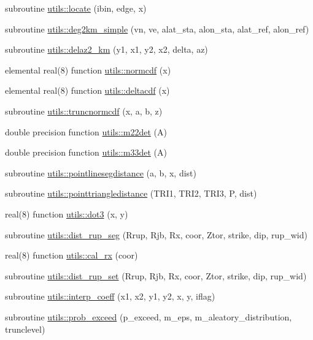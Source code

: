\begin{DoxyCompactItemize}
\item 
subroutine \hyperlink{namespaceutils_a6c61290deedf912e6810628145911f85}{utils\+::locate} (ibin, edge, x)
\item 
subroutine \hyperlink{namespaceutils_aa0f32919ddbbde1b5238425529660459}{utils\+::deg2km\+\_\+simple} (vn, ve, alat\+\_\+sta, alon\+\_\+sta,                                           alat\+\_\+ref, alon\+\_\+ref)
\item 
subroutine \hyperlink{namespaceutils_aa1dce66e1b3b67f4ff37fa7a949cb7b4}{utils\+::delaz2\+\_\+km} (y1, x1, y2, x2, delta, az)
\item 
elemental real(8) function \hyperlink{namespaceutils_aa41cc7594a2b7ecd3f3931859172f175}{utils\+::normcdf} (x)
\item 
elemental real(8) function \hyperlink{namespaceutils_a568d3767bca697c86b861637a25888f8}{utils\+::deltacdf} (x)
\item 
subroutine \hyperlink{namespaceutils_ac313e8810c0e461aa91b7299c8fba4be}{utils\+::truncnormcdf} (x, a, b, z)
\item 
double precision function \hyperlink{namespaceutils_a64e66c94f05898717cbc1863f70c9be1}{utils\+::m22det} (A)
\item 
double precision function \hyperlink{namespaceutils_a9bad87c0b79a45b5c6e6bbfcb2c6a126}{utils\+::m33det} (A)
\item 
subroutine \hyperlink{namespaceutils_aa037ebfaff3336105e73f563fdab02a8}{utils\+::pointlinesegdistance} (a, b, x, dist)
\item 
subroutine \hyperlink{namespaceutils_aebfee5643eb6828d1b6fd64229189af0}{utils\+::pointtriangledistance} (T\+R\+I1, T\+R\+I2, T\+R\+I3, P, dist)
\item 
real(8) function \hyperlink{namespaceutils_ab5a1a9ca34591c37c7fb606189317e16}{utils\+::dot3} (x, y)
\item 
subroutine \hyperlink{namespaceutils_af6906785e7d185fbdf7034969aababc4}{utils\+::dist\+\_\+rup\+\_\+seg} (Rrup, Rjb, Rx, coor, Ztor, strike, dip, rup\+\_\+wid)
\item 
real(8) function \hyperlink{namespaceutils_aa1727e2ba89368130186d248fd7b71b4}{utils\+::cal\+\_\+rx} (coor)
\item 
subroutine \hyperlink{namespaceutils_a3dfc1e25be8aa02534fda1a437ec9855}{utils\+::dist\+\_\+rup\+\_\+set} (Rrup, Rjb, Rx, coor, Ztor, strike, dip, rup\+\_\+wid)
\item 
subroutine \hyperlink{namespaceutils_ae3d121578601cfdb0b2687656ea19761}{utils\+::interp\+\_\+coeff} (x1, x2, y1, y2, x, y, iflag)
\item 
subroutine \hyperlink{namespaceutils_a47c34e02c3a6ca718ff160f085117f47}{utils\+::prob\+\_\+exceed} (p\+\_\+exceed, m\+\_\+eps, m\+\_\+aleatory\+\_\+distribution, trunclevel)
\end{DoxyCompactItemize}
